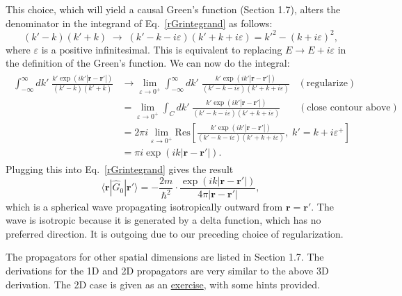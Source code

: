 \documentclass[pra,12pt]{revtex4-2}
\begin{document}
\noindent
This choice, which will yield a causal Green's function (Section 1.7),
alters the denominator in the integrand of Eq.~\eqref{rGrintegrand} as
follows:
\begin{equation}
  (k' - k)(k'+k) \;\rightarrow\; (k' - k - i\varepsilon)(k'+k+i\varepsilon) = {k'}^2 - (k+i\varepsilon)^2,
\end{equation}
where $\varepsilon$ is a positive infinitesimal.  This is equivalent
to replacing $E \rightarrow E + i\varepsilon$ in the definition of the
Green's function.  We can now do the integral:
\begin{align*}
  \begin{aligned}\int_{-\infty}^\infty dk' \; \frac{\displaystyle k' \exp\left(ik'|\mathbf{r}-\mathbf{r}'|\right)}{(k' - k)(k'+k)} &\rightarrow \lim_{\varepsilon \rightarrow 0^+} \int_{-\infty}^\infty dk' \; \frac{\displaystyle k' \exp\left(ik'|\mathbf{r}-\mathbf{r}'|\right)}{(k' - k - i\varepsilon)(k'+k+i\varepsilon)}\;\;\; (\text{regularize}) \\ &= \lim_{\varepsilon \rightarrow 0^+} \int_C dk' \; \frac{\displaystyle k' \exp\left(ik'|\mathbf{r}-\mathbf{r}'|\right)}{(k' - k - i\varepsilon)(k'+k+i\varepsilon)} \quad\;\;\; (\text{close contour above}) \\ &= 2\pi i \lim_{\varepsilon \rightarrow 0^+} \mathrm{Res}\left[\frac{\displaystyle k' \exp\left(ik'|\mathbf{r}-\mathbf{r}'|\right)}{(k' - k - i\varepsilon)(k'+k+i\varepsilon)}, \;k'=k+i\varepsilon^+\right] \\ &= \pi i \exp\left(ik|\mathbf{r}-\mathbf{r}'|\right).\end{aligned}
\end{align*}
Plugging this into Eq.~\eqref{rGrintegrand} gives the result
\begin{equation}
  \langle\mathbf{r}|\hat{G}_0|\mathbf{r}'\rangle = -\frac{2m}{\hbar^2}
  \cdot \frac{\exp\left(ik|\mathbf{r}-\mathbf{r}'|\right)}{4\pi|\mathbf{r}-\mathbf{r}'|},
\end{equation}
which is a spherical wave propagating isotropically outward from
$\mathbf{r} = \mathbf{r}'$.  The wave is isotropic because it is
generated by a delta function, which has no preferred direction.  It
is outgoing due to our preceding choice of regularization.

The propagators for other spatial dimensions are listed in Section
1.7.  The derivations for the 1D and 2D propagators are very similar
to the above 3D derivation.  The 2D case is given as an
\hyperref[ex:2dpropagator]{exercise}, with some hints provided.
\end{document}
